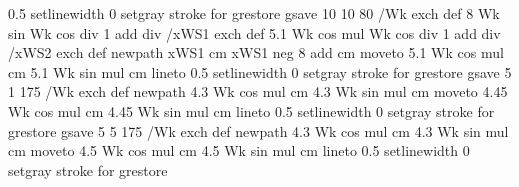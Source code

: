{{{                   0.5 setlinewidth
                   0 setgray
                   stroke
                } for
  grestore
  gsave
      10 10 80 { /Wk exch def
                        {8 Wk sin Wk cos div 1 add div} /xWS1 exch def
                        {5.1 Wk cos mul  Wk cos div 1 add div} /xWS2 exch def
                        newpath
                        xWS1 cm xWS1 neg 8 add cm moveto
                        5.1 Wk cos mul cm 5.1 Wk sin mul cm
                        lineto
                        0.5 setlinewidth
                        0 setgray
                        stroke
                   } for
  grestore
  gsave
          5 1 175 { /Wk exch def
                           newpath
                           4.3 Wk cos mul cm 4.3 Wk sin mul cm moveto
                           4.45 Wk cos mul cm 4.45 Wk sin mul cm
                           lineto
                           0.5 setlinewidth
                           0 setgray
                           stroke
                        } for
  grestore
  gsave
         5 5 175 { /Wk exch def
                          newpath
                         4.3 Wk cos mul cm 4.3 Wk sin mul cm moveto
                         4.5 Wk cos mul cm 4.5 Wk sin mul cm
                         lineto
                         0.5 setlinewidth
                         0 setgray
                         stroke
                     } for
  grestore
}}
